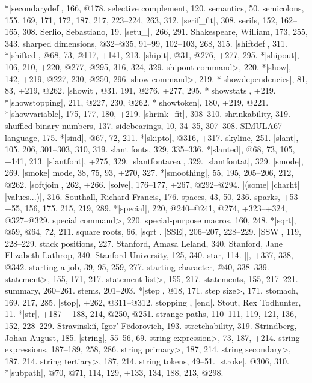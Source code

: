 *|secondarydef|, 166, @178.
selective complement, 120.
semantics, 50.
semicolons, 155, 169, 171, 172, 187, 217, 223--224, 263, 312.
|serif_fit|, 308.
serifs, 152, 162--165, 308.
Serlio, Sebastiano, 19.
|setu_|, 266, 291.
Shakespeare, William, 173, 255, 343.
sharped dimensions, @32--@35, 91--99, 102--103, 268, 315.
|shiftdef|, 311.
*|shifted|, @68, 73, @117, +141, 213.
|shipit|, @31, @276, +277, 295.
*|shipout|, 106, 210, +220, @277, @295, 316, 324, 329.
\<shipout command>, 220.
*|show|, 142, +219, @227, 230, @250, 296.
\<show command>, 219.
*|showdependencies|, 81, 83, +219, @262.
|showit|, @31, 191, @276, +277, 295.
*|showstats|, +219.
*|showstopping|, 211, @227, 230, @262.
*|showtoken|, 180, +219, @221.
*|showvariable|, 175, 177, 180, +219.
|shrink_fit|, 308--310.
shrinkability, 319.
shuffled binary numbers, 137.
sidebearings, 10, 34--35, 307--308.
{\sevenrm SIMULA67} language, 175.
*|sind|, @67, 72, 211.
*|skipto|, @316, +317.
skyline, 251.
|slant|, 105, 206, 301--303, 310, 319.
slant fonts, 329, 335--336.
*|slanted|, @68, 73, 105, +141, 213.
|slantfont|, +275, 329.
|slantfontarea|, 329.
|slantfontat|, 329.
|smode|, 269.
|smoke| mode, 38, 75, 93, +270, 327.
*|smoothing|, 55, 195, 205--206, 212, @262.
|softjoin|, 262, +266.
|solve|, 176--177, +267, @292--@294.
|(some| |charht| |values...)|, 316.
Southall, Richard Francis, 176.
spaces, 43, 50, 236.
sparks, +53--+55, 156, 175, 215, 219, 289.
*|special|, 220, @240--@241, @274, +323--+324, @327--@329.
\<special command>, 220.
special-purpose macros, 160, 248.
*|sqrt|, @59, @64, 72, 211.
square roots, 66, \also |sqrt|.
|SSE|, 206--207, 228--229.
|SSW|, 119, 228--229.
stack positions, 227.
Stanford, Amasa Leland, 340.
Stanford, Jane Elizabeth Lathrop, 340.
Stanford University, 125, 340.
star, 114.
|\startfont|, +337, 338, @342.
starting a job, 39, 95, 259, 277.
starting character, @40, 338--339.
\<statement>, 155, 171, 217.
\<statement list>, 155, 217.
statements, 155, 217--221.
\sub summary, 260--261.
stems, 201--203.
*|step|, @18, 171.
\<step size>, 171.
stomach, 169, 217, 285.
|stop|, +262, @311--@312.
stopping \MF, \see |end|.
Stout, Rex Todhunter, 11.
*|str|, +187--+188, 214, @250, @251.
strange paths, 110--111, 119, 121, 136, 152, 228--229.
Stravinski{\u\i}, Igor' F\"edorovich, 193.
stretchability, 319.
Strindberg, Johan August, 185.
|string|, 55--56, 69.
\<string expression>, 73, 187, +214.
string expressions, 187--189, 258, 286.
\<string primary>, 187, 214.
\<string secondary>, 187, 214.
\<string tertiary>, 187, 214.
string tokens, 49--51.
|stroke|, @306, 310.
*|subpath|, @70, @71, 114, 129, +133, 134, 188, 213, @298.
